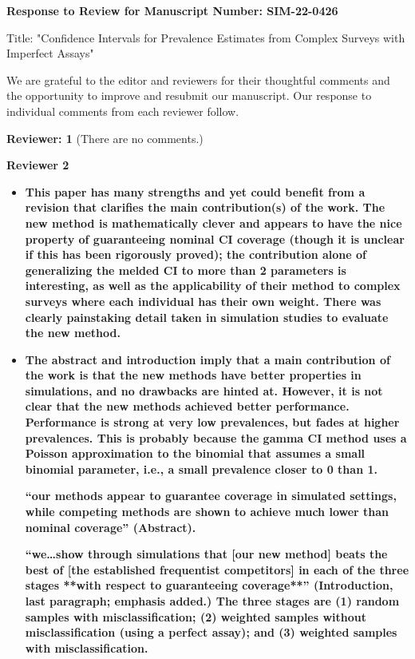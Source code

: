 \documentclass[11pt]{article}
\begin{document}
\textbf{Response to Review for Manuscript Number: SIM-22-0426}


Title: "Confidence Intervals for Prevalence Estimates from Complex Surveys with Imperfect Assays"

We are grateful to the editor and reviewers for their thoughtful comments and the opportunity to improve and resubmit our manuscript.
Our response to individual comments from each reviewer follow.

\textbf{Reviewer: 1}
(There are no comments.)

\textbf{Reviewer 2}

\begin{itemize}
    \item \textbf{This paper has many strengths and yet could benefit from a revision that clarifies the main contribution(s) of the work. The new method is mathematically clever and appears to have the nice property of guaranteeing nominal CI coverage (though it is unclear if this has been rigorously proved); the contribution alone of generalizing the melded CI to more than 2 parameters is interesting, as well as the applicability of their method to complex surveys where each individual has their own weight. There was clearly painstaking detail taken in simulation studies to evaluate the new method.}

    \item \textbf{The abstract and introduction imply that a main contribution of the work is that the new methods have better properties in simulations, and no drawbacks are hinted at. However, it is not clear that the new methods achieved better performance. Performance is strong at very low prevalences, but fades at higher prevalences. This is probably because the gamma CI method uses a Poisson approximation to the binomial that assumes a small binomial parameter, i.e., a small prevalence closer to 0 than 1.}

    \textbf{“our methods appear to guarantee coverage in simulated settings, while competing methods are shown to achieve much lower than nominal coverage” (Abstract).}

    \textbf{“we…show through simulations that [our new method] beats the best of [the established frequentist competitors] in each of the three stages **with respect to guaranteeing coverage**” (Introduction, last paragraph; emphasis added.) The three stages are (1) random samples with misclassification; (2) weighted samples without misclassification (using a perfect assay); and (3) weighted samples with misclassification.}



\end{itemize}
\end{document}

